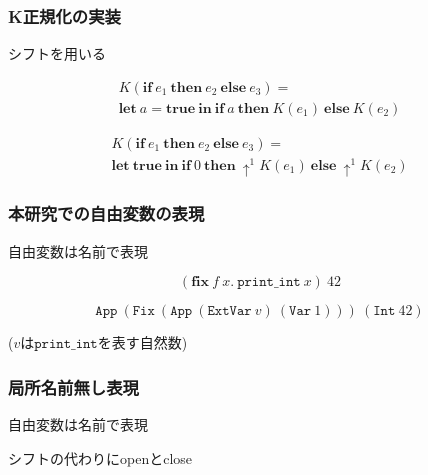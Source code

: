 \documentclass[dvipdfmx,cjk,xcolor=dvipsnames,envcountsect,notheorems,12pt]{beamer}
\theoremstyle{definition}
\newcommand{\keyword}[1]{\mathbf{#1}}
\newcommand{\LET}{\keyword{let}}
\newcommand{\IF}{\keyword{if}}
\newcommand{\THEN}{\keyword{then}}
\newcommand{\ELSE}{\keyword{else}}
\newcommand{\FIX}{\keyword{fix}}
\newcommand{\IN}{\keyword{in}}
\newcommand{\TRUE}{\keyword{true}}
\begin{document}
\begin{frame}[fragile]
	\frametitle{K正規化の実装}
	\LARGE シフトを用いる

	\vfill

	{\large \[\begin{array}{l}
		K(\IF~e_1~\THEN~e_2~\ELSE~e_3) = \\
		\LET~a=\TRUE~\IN~\IF~a~\THEN~ K(e_1)~\ELSE~ K(e_2)
	\end{array}\]

	\vfill
	
	\[\begin{array}{l}
		K(\IF~e_1~\THEN~e_2~\ELSE~e_3) = \\
		\LET~\TRUE~\IN~\IF~0~\THEN~\uparrow^1 K(e_1)~\ELSE~\uparrow^1 K(e_2)
	\end{array}\]}
\end{frame}

\begin{frame}
	\frametitle{本研究での自由変数の表現}
	\LARGE
	自由変数は名前で表現

	\vfill

	{\Large \[(\FIX~f~x.~\texttt{print\_int}~x)~42\]

	\vfill

	\[\texttt{App}~(\texttt{Fix}~(\texttt{App}~(\texttt{ExtVar}~v)~(\texttt{Var}~1)))~(\texttt{Int}~42)\]}
	{\large \begin{center}
		($v$は$\texttt{print\_int}$を表す自然数)
	\end{center}}
\end{frame}

\begin{frame}
	\frametitle{局所名前無し表現}
	\LARGE 自由変数は名前で表現

	\vfill 

	シフトの代わりにopenとclose

\end{frame}
\end{document}
